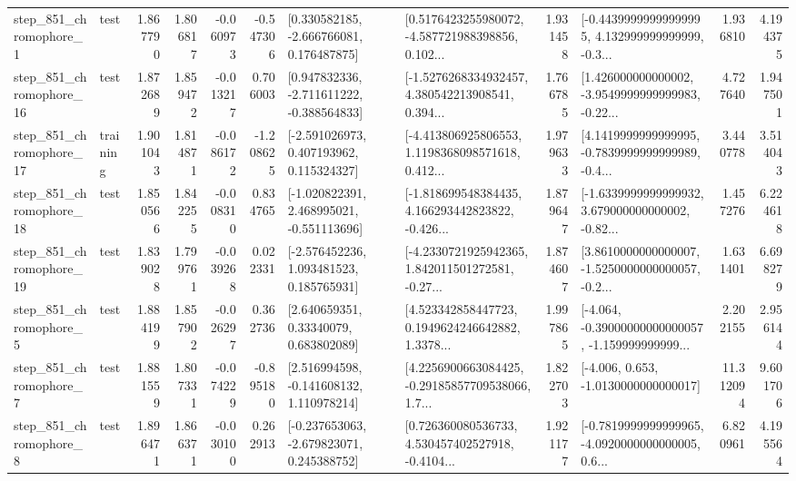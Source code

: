\begin{tabular}{llrrrrllrlrr}
   step\_851\_chromophore\_1 &      test &      1.867790 &    1.806817 &     -0.060973 & -0.547306 &    [0.330582185, -2.666766081, 0.176487875] &  [0.5176423255980072, -4.587721988398856, 0.102... &       1.931458 &  [-0.44399999999999995, 4.132999999999999, -0.3... &            1.936810 &          4.194375 \\
  step\_851\_chromophore\_16 &      test &      1.872689 &    1.859472 &     -0.013217 &  0.706003 &   [0.947832336, -2.711611222, -0.388564833] &  [-1.5276268334932457, 4.380542213908541, 0.394... &       1.766785 &  [1.426000000000002, -3.9549999999999983, -0.22... &            4.727640 &          1.947501 \\
  step\_851\_chromophore\_17 &  training &      1.901043 &    1.814871 &     -0.086172 & -1.208625 &    [-2.591026973, 0.407193962, 0.115324327] &  [-4.413806925806553, 1.1198368098571618, 0.412... &       1.979633 &  [4.1419999999999995, -0.7839999999999989, -0.4... &            3.440778 &          3.514043 \\
  step\_851\_chromophore\_18 &      test &      1.850566 &    1.842255 &     -0.008310 &  0.834765 &   [-1.020822391, 2.468995021, -0.551113696] &  [-1.818699548384435, 4.166293442823822, -0.426... &       1.879647 &  [-1.6339999999999932, 3.679000000000002, -0.82... &            1.457276 &          6.224618 \\
  step\_851\_chromophore\_19 &      test &      1.839028 &    1.799761 &     -0.039268 &  0.022331 &    [-2.576452236, 1.093481523, 0.185765931] &  [-4.2330721925942365, 1.842011501272581, -0.27... &       1.874607 &  [3.8610000000000007, -1.5250000000000057, -0.2... &            1.631401 &          6.698279 \\
   step\_851\_chromophore\_5 &      test &      1.884199 &    1.857902 &     -0.026297 &  0.362736 &      [2.640659351, 0.33340079, 0.683802089] &  [4.523342858447723, 0.1949624246642882, 1.3378... &       1.997865 &  [-4.064, -0.39000000000000057, -1.159999999999... &            2.202155 &          2.956144 \\
   step\_851\_chromophore\_7 &      test &      1.881559 &    1.807331 &     -0.074229 & -0.895180 &    [2.516994598, -0.141608132, 1.110978214] &  [4.2256900663084425, -0.29185857709538066, 1.7... &       1.822703 &               [-4.006, 0.653, -1.0130000000000017] &           11.312094 &          9.601706 \\
   step\_851\_chromophore\_8 &      test &      1.896471 &    1.866371 &     -0.030100 &  0.262913 &   [-0.237653063, -2.679823071, 0.245388752] &  [0.726360080536733, 4.530457402527918, -0.4104... &       1.921177 &  [-0.7819999999999965, -4.0920000000000005, 0.6... &            6.820961 &          4.195564 \\

\end{tabular}
